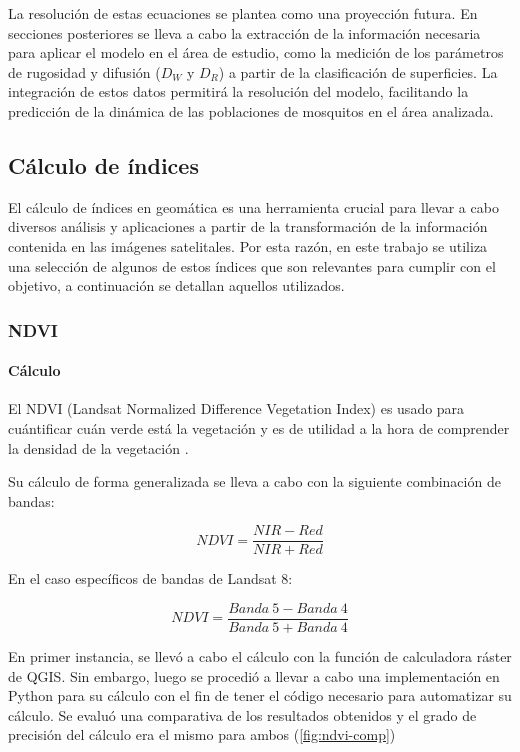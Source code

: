 La resolución de estas ecuaciones se plantea como una proyección futura. En secciones posteriores se lleva a cabo la extracción de la información necesaria para aplicar el modelo en el área de estudio, como la medición de los parámetros de rugosidad y difusión ($D_W$ y $D_R$) a partir de la clasificación de superficies. La integración de estos datos permitirá la resolución del modelo, facilitando la predicción de la dinámica de las poblaciones de mosquitos en el área analizada.

\subsection{Cálculo de índices}

El cálculo de índices en geomática es una herramienta crucial para llevar a cabo diversos análisis y aplicaciones a partir de la transformación de la información contenida en las imágenes satelitales. Por esta razón, en este trabajo se utiliza una selección de algunos de estos índices que son relevantes para cumplir con el objetivo, a continuación se detallan aquellos utilizados.

\subsubsection{NDVI} \label{ndvi}

\paragraph{Cálculo}

El NDVI (Landsat Normalized Difference Vegetation Index) es usado para cuántificar cuán verde está la vegetación y es de utilidad a la hora de comprender la densidad de la vegetación \parencite{noauthor_landsat_nodate}.

Su cálculo de forma generalizada se lleva a cabo con la siguiente combinación de bandas:

$$NDVI=\frac{NIR-Red}{NIR+Red}$$

En el caso específicos de bandas de Landsat 8:

$$NDVI=\frac{Banda~5 - Banda~4}{Banda~5 + Banda~4}$$

En primer instancia, se llevó a cabo el cálculo con la función de calculadora ráster de QGIS. Sin embargo, luego se procedió a llevar a cabo una implementación en Python para su cálculo con el fin de tener el código necesario para automatizar su cálculo. Se evaluó una comparativa de los resultados obtenidos y el grado de precisión del cálculo era el mismo para ambos (\figurename \ref{fig:ndvi-comp})

